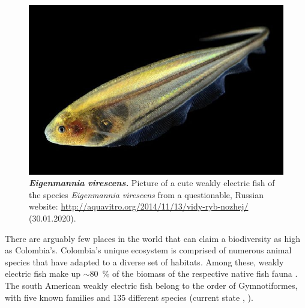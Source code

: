 \begin{figure}
    \centering
    \includegraphics[width = \textwidth]{pictures/Eigenmannia_virescens.jpg}
    \caption{\textit{\textbf{Eigenmannia virescens.}} Picture of a cute weakly electric fish of the species \textit{Eigenmannia virescens} from a questionable, Russian website: \url{http://aquavitro.org/2014/11/13/vidy-ryb-nozhej/} (30.01.2020).}
    \label{fig:eigenmannia_cute}
\end{figure}

There  are  arguably  few  places  in  the  world  that  can  claim  a biodiversity as high as Colombia’s. Colombia’s unique ecosystem is comprised of numerous animal species that have adapted to a diverse set of habitats. Among these, weakly electric fish make up $\sim$80~\%  of the biomass of the respective native fish fauna \citep{marrero1991notas}. The south American weakly electric fish belong to the order of Gymnotiformes, with five known families and 135 different species (current state \citeyear{albert2005diversity}, \citeauthor{albert2005diversity}).

